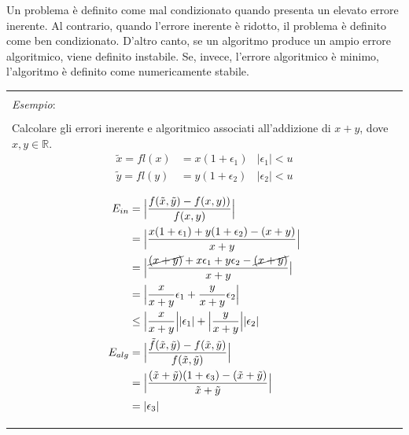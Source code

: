 \documentclass{article}
\numberwithin{equation}{section}
\newenvironment{example}
{\begin{center}
        \begin{tabular}{|p{0.9\textwidth}|}
            \hline \\ 
            \textit{Esempio}: \\\\ 
        }
        {
            \\\\ \hline
        \end{tabular}
    \end{center}
}
\begin{document}
Un problema è definito come mal condizionato quando presenta un elevato errore inerente.
Al contrario, quando l'errore inerente è ridotto, il problema è definito come ben condizionato. 
D'altro canto, se un algoritmo produce un ampio errore algoritmico, viene
definito instabile.
Se, invece, l'errore algoritmico è minimo, l'algoritmo è definito come numericamente stabile.

\begin{example}
    Calcolare gli errori inerente e algoritmico associati all'addizione di
    $x+y$, dove $x,y\in \mathbb{R}$.
    \begin{equation*}
        \begin{aligned}
            \tilde{x}=fl(x) &= x(1+\epsilon_1) & |\epsilon_1| < u \\
            \tilde{y}=fl(y) &= y(1+\epsilon_2) & |\epsilon_2| < u \\
        \end{aligned} 
     \end{equation*}
    \begin{equation*}
       \begin{aligned}
           E_{in}&= \Big\lvert \frac{f(\tilde{x},\tilde{y})-f(x,y))}{f(x,y)}\Big\rvert\\
            &=\Big\lvert
           \frac{x(1+\epsilon_1)+y(1+\epsilon_2)-(x+y)}{x+y}\Big\rvert \\
                 &=\Big\lvert
                     \frac{\cancel{(x+y)}+x\epsilon_1+y\epsilon_2-\cancel{(x+y)}}{x+y}
                    \big\rvert \\ 
                &=\Big\lvert
                \frac{x}{x+y}\epsilon_1+\frac{y}{x+y}\epsilon_2\Big\rvert\\ 
                &\leq \Big\lvert \frac{x}{x+y}\Big\rvert \lvert
                \epsilon_1\rvert + \Big\lvert \frac{y}{x+y}\Big\rvert \lvert
                \epsilon_2\rvert\\
           E_{alg}&=\Big\lvert
           \frac{\tilde{f}(\tilde{x},\tilde{y})-f(\tilde{x},\tilde{y})}{f(\tilde{x},\tilde{y})}\Big\rvert
           \\ 
                &= \Big\lvert
                \frac{(\tilde{x}+\tilde{y})(1+\epsilon_3)-(\tilde{x}+\tilde{y})}{\tilde{x}+\tilde{y}}\Big\rvert\\
                &= \lvert \epsilon_3\rvert
       \end{aligned} 
    \end{equation*}
\end{example}
\end{document}
